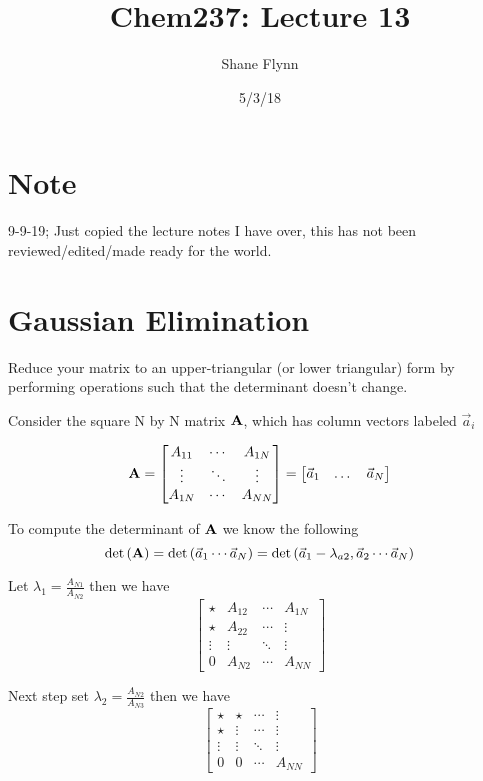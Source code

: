 \documentclass{article}
\title{Chem237: Lecture 13}
\date{5/3/18}
\author{Shane Flynn}
\newcommand{\be}{\begin{equation}}
\newcommand{\ee}{\end{equation}}
\newcommand{\bA}{\mbox{\bf A}}
\begin{document}
\maketitle

\section{Note}
9-9-19; Just copied the lecture notes I have over, this has not been reviewed/edited/made ready for the world. 

\section*{Gaussian Elimination}
Reduce your matrix to an upper-triangular (or lower triangular) form by performing operations such that the determinant doesn't change. 

Consider the square N by N matrix $\bA$, which has column vectors labeled $\vec{a}_i$

\be
\bA =  
\begin{bmatrix}
    A_{11}  & \dotsb &  A_{1N} \\
    \vdots  & \ddots &  \vdots \\
    A_{1N}  & \dotsb &  A_{NN} 
\end{bmatrix}
    = 
\begin{bmatrix}
        \vec{a}_1 & \dots  & \vec{a}_N 
\end{bmatrix}
\ee

To compute the determinant of $\bA$ we know the following
\be
\det\left(\bA\right) = \det\left(\vec{a}_1 \cdots  \vec{a}_N \right) = \det\left(\vec{a}_1- \lambda_{a2}, \vec{a}_2 \cdots \vec{a}_N \right) 
\ee

Let $\lambda_1 = \frac{A_{N1}}{A_{N2}}$ then we have
\be
\begin{bmatrix}
    \star  & A_{12} & \dotsb &  A_{1N} \\
    \star & A_{22} &\dotsb &  \vdots \\
    \vdots & \vdots &  \ddots &  \vdots \\
    0  & A_{N2} & \dotsb &  A_{NN} 
\end{bmatrix}
\ee

Next step set $\lambda_2 = \frac{A_{N2}}{A_{N3}}$ then we have
\be
\begin{bmatrix}
    \star  & \star & \dotsb & \vdots \\
    \star & \vdots &\dotsb &  \vdots \\
    \vdots & \vdots &  \ddots &  \vdots \\
    0  & 0 & \dotsb &  A_{NN} 
\end{bmatrix}
\ee
\end{document}
